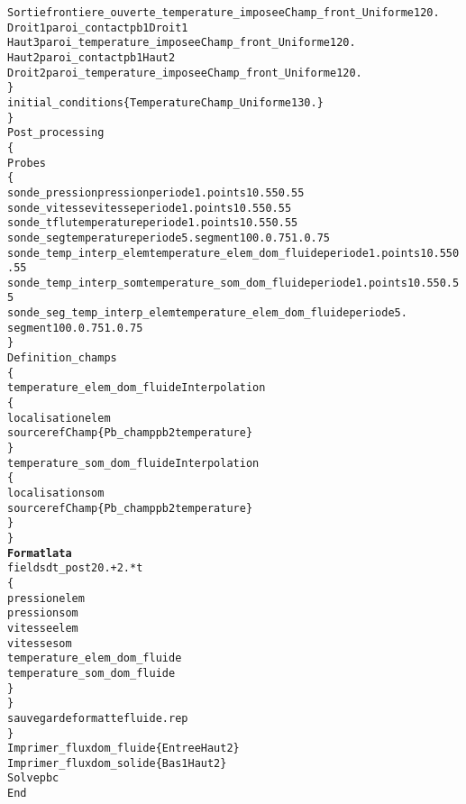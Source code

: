 \begin{alltt}
            Sortie frontiere_ouverte_temperature_imposee    Champ_front_Uniforme 1 20.
            Droit1 paroi_contact pb1  Droit1
            Haut3  paroi_temperature_imposee    Champ_front_Uniforme 1 20.
            Haut2  paroi_contact pb1  Haut2
            Droit2 paroi_temperature_imposee    Champ_front_Uniforme 1 20.
        \}
        initial_conditions \{ Temperature Champ_Uniforme 1 30. \}
    \}
    Post_processing
    \{
        Probes
        \{
            sonde_pression  pression periode 1.     points 1    0.55 0.55
            sonde_vitesse   vitesse periode 1.      points 1    0.55 0.55
            sonde_tflu      temperature periode 1.  points 1    0.55 0.55
            sonde_seg       temperature periode 5.  segment 10 0. 0.75 1. 0.75
            sonde_temp_interp_elem temperature_elem_dom_fluide periode 1. points 1   0.55 0.55
            sonde_temp_interp_som  temperature_som_dom_fluide  periode 1. points 1   0.55 0.55
            sonde_seg_temp_interp_elem temperature_elem_dom_fluide periode 5. 
                                                                    segment 10 0. 0.75 1. 0.75
        \}
        Definition_champs 
        \{
            temperature_elem_dom_fluide Interpolation
            \{
                localisation elem
                source refChamp \{ Pb_champ pb2 temperature \}
            \}
            temperature_som_dom_fluide Interpolation 
            \{
                localisation som
                source refChamp \{ Pb_champ pb2 temperature \}
            \}
        \}
        {\bf{Format lata}}
        fields dt_post 20.+2.*t
        \{
            pression elem
            pression som
            vitesse elem
            vitesse som
            temperature_elem_dom_fluide
            temperature_som_dom_fluide
        \}
    \}
    sauvegarde formatte fluide.rep
\}
Imprimer_flux dom_fluide \{ Entree Haut2 \}
Imprimer_flux dom_solide \{ Bas1 Haut2 \}
Solve pbc
End
\end{alltt}
